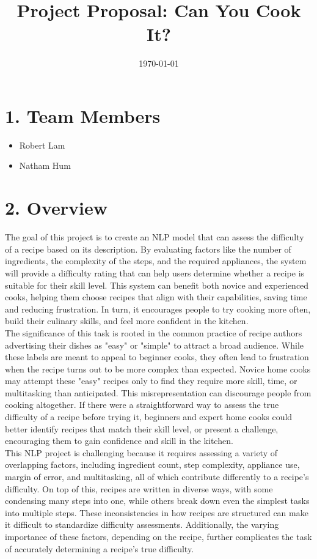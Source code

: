\documentclass{article}
\title{Project Proposal: Can You Cook It?}
\date{\today}
\begin{document}
\maketitle

\section*{1. Team Members}
\begin{itemize}
    \item Robert Lam
    \item Natham Hum
\end{itemize}

\section*{2. Overview}

The goal of this project is to create an NLP model that can assess the difficulty of a recipe based on its description. By evaluating factors like the number of ingredients, the complexity of the steps, and the required appliances, the system will provide a difficulty rating that can help users determine whether a recipe is suitable for their skill level. This system can benefit both novice and experienced cooks, helping them choose recipes that align with their capabilities, saving time and reducing frustration. In turn, it encourages people to try cooking more often, build their culinary skills, and feel more confident in the kitchen.\\

The significance of this task is rooted in the common practice of recipe authors advertising their dishes as "easy" or "simple" to attract a broad audience. While these labels are meant to appeal to beginner cooks, they often lead to frustration when the recipe turns out to be more complex than expected. Novice home cooks may attempt these "easy" recipes only to find they require more skill, time, or multitasking than anticipated. This misrepresentation can discourage people from cooking altogether. If there were a straightforward way to assess the true difficulty of a recipe before trying it, beginners and expert home cooks could better identify recipes that match their skill level, or present a challenge, encouraging them to gain confidence and skill in the kitchen.\\

This NLP project is challenging because it requires assessing a variety of overlapping factors, including ingredient count, step complexity, appliance use, margin of error, and multitasking, all of which contribute differently to a recipe's difficulty. On top of this, recipes are written in diverse ways, with some condensing many steps into one, while others break down even the simplest tasks into multiple steps. These inconsistencies in how recipes are structured can make it difficult to standardize difficulty assessments. Additionally, the varying importance of these factors, depending on the recipe, further complicates the task of accurately determining a recipe's true difficulty.
\end{document}

